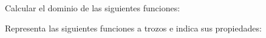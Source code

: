 \documentclass[spanish, 11pt]{exam}
\begin{document}
\begin{questions}
\question Calcular el dominio de las siguientes funciones:
\begin{multicols}{2}
\end{multicols}

\question Representa las siguientes funciones a trozos e indica sus propiedades:
\begin{multicols}{2}
\begin{parts} 

\end{parts}
\end{multicols}
\end{questions}
\end{document}
